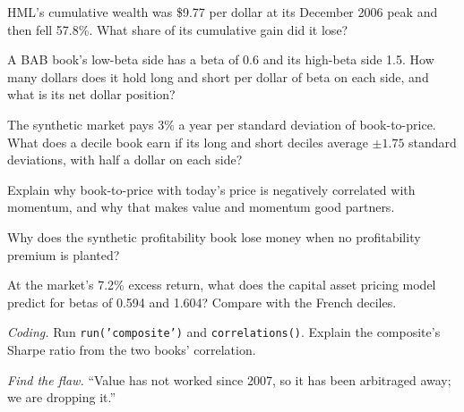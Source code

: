 \begin{exercise}[$\star$]\label{exo:s1:value-quality-and-low-risk:1}
HML's cumulative wealth was \$9.77 per dollar at its December 2006 peak and then fell 57.8\%. What share of its cumulative gain did it lose?
\end{exercise}

\begin{exercise}[$\star$]\label{exo:s1:value-quality-and-low-risk:2}
A BAB book's low-beta side has a beta of 0.6 and its high-beta side 1.5. How many dollars does it hold long and short per dollar of beta on each side, and
what is its net dollar position?
\end{exercise}

\begin{exercise}[$\star$]\label{exo:s1:value-quality-and-low-risk:3}
The synthetic market pays 3\% a year per standard deviation of book-to-price. What does a decile book earn if its long and short deciles average $\pm 1.75$
standard deviations, with half a dollar on each side?
\end{exercise}

\begin{exercise}[$\star\star$]\label{exo:s1:value-quality-and-low-risk:4}
Explain why book-to-price with today's price is negatively correlated with momentum, and why that makes value and momentum good partners.
\end{exercise}

\begin{exercise}[$\star\star$]\label{exo:s1:value-quality-and-low-risk:5}
Why does the synthetic profitability book lose money when no profitability premium is planted?
\end{exercise}

\begin{exercise}[$\star\star$]\label{exo:s1:value-quality-and-low-risk:6}
At the market's 7.2\% excess return, what does the capital asset pricing model predict for betas of 0.594 and 1.604? Compare with the French deciles.
\end{exercise}

\begin{exercise}[$\star\star\star$]\label{exo:s1:value-quality-and-low-risk:7}
\emph{Coding.} Run \texttt{run('composite')} and \texttt{correlations()}. Explain the composite's Sharpe ratio from the two books' correlation.
\end{exercise}

\begin{exercise}[$\star\star\star$]\label{exo:s1:value-quality-and-low-risk:8}
\emph{Find the flaw.} ``Value has not worked since 2007, so it has been arbitraged away; we are dropping it.''
\end{exercise}


